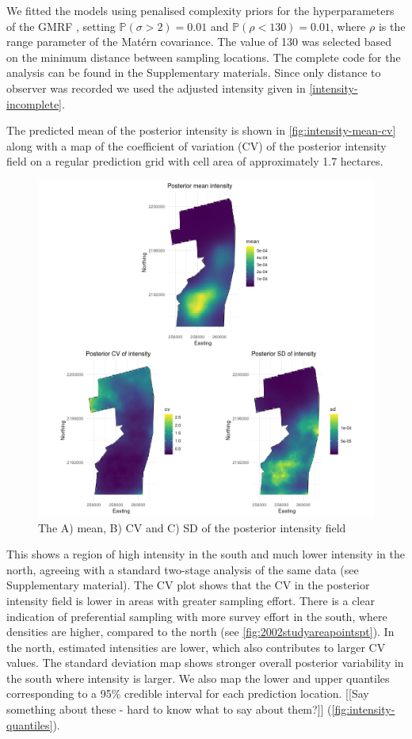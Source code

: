 \documentclass[preprint,12pt]{elsarticle}
\begin{document}
We fitted the models using penalised complexity priors for the hyperparameters of the GMRF \citep{simpson_penalising_2017}, setting $\mathbb{P}(\sigma > 2) = 0.01$ and $\mathbb{P}(\rho < 130) = 0.01$, where $\rho$ is the range parameter of the Mat\'ern covariance.  The value of 130 was selected based on the minimum distance between sampling locations.  The complete code for the analysis can be found in the Supplementary materials.  Since only distance to observer was recorded we used the adjusted intensity given in \eqref{intensity-incomplete}.   

The predicted mean of the posterior intensity is shown in \autoref{fig:intensity-mean-cv} along with a map of the coefficient of variation (CV) of the posterior intensity field on a regular prediction grid with cell area of approximately 1.7 hectares.  
\begin{figure}[h]
	\begin{center}
		\includegraphics[scale=0.525]{figures/intensity_mean_cv_sd.png}
		\caption{The A) mean, B) CV and C) SD of the posterior intensity field}
		\label{fig:intensity-mean-cv}
	\end{center}
\end{figure}
This shows a region of high intensity in the south and much lower intensity in the north, agreeing with a standard two-stage analysis of the same data (see Supplementary material).  The CV plot shows that the CV in the posterior intensity field is lower in areas with greater sampling effort.  There is a clear indication of preferential sampling with more survey effort in the south, where densities are higher, compared to the north  (see \autoref{fig:2002studyareapointspt}).  In the north, estimated intensities are lower, which also contributes to larger CV values.  The standard deviation map shows stronger overall posterior variability in the south where intensity is larger.  We also map the lower and upper quantiles corresponding to a 95\% credible interval for each prediction location.  [[Say something about these - hard to know what to say about them?]]   (\autoref{fig:intensity-quantiles}).
\end{document}
